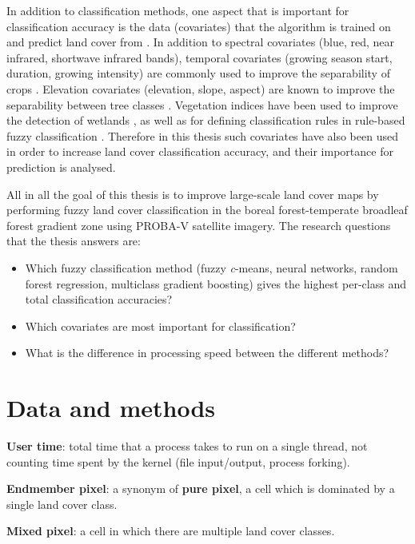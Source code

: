 \documentclass[a4paper,12pt]{scrbook}
\begin{document}
In addition to classification methods, one aspect that is important for classification accuracy is the data (covariates) that the algorithm is trained on and predict land cover from \citep{yu2014metadiscoveries}. In addition to spectral covariates (blue, red, near infrared, shortwave infrared bands), temporal covariates (growing season start, duration, growing intensity) are commonly used to improve the separability of crops \citep{jakubauskas2001harmonic}. Elevation covariates (elevation, slope, aspect) are known to improve the separability between tree classes \citep{burrough2001fuzzy}. Vegetation indices have been used to improve the detection of wetlands \citep{sader1995wetlands}, as well as for defining classification rules in rule-based fuzzy classification \citep{baraldi2006rulebased}. Therefore in this thesis such covariates have also been used in order to increase land cover classification accuracy, and their importance for prediction is analysed.

All in all the goal of this thesis is to improve large-scale land cover maps by performing fuzzy land cover classification in the boreal forest-temperate broadleaf forest gradient zone using PROBA-V satellite imagery. The research questions that the thesis answers are:

\begin{itemize}
 \item Which fuzzy classification method (fuzzy \textit{c}-means, neural networks, random forest regression, multiclass gradient boosting) gives the highest per-class and total classification accuracies?
 \item Which covariates are most important for classification?
 \item What is the difference in processing speed between the different methods?
\end{itemize}

\chapter{Data and methods}

\textbf{User time}: total time that a process takes to run on a single thread, not counting time spent by the kernel (file input/output, process forking).

\textbf{Endmember pixel}: a synonym of \textbf{pure pixel}, a cell which is dominated by a single land cover class.

\textbf{Mixed pixel}: a cell in which there are multiple land cover classes.
\end{document}
